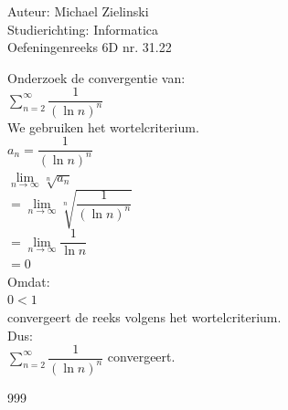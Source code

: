 \documentclass[a4paper]{article}
\begin{document}
  
\noindent \large Auteur: Michael Zielinski \\
\noindent \large Studierichting: Informatica \\
\noindent \large Oefeningenreeks 6D nr. 31.22 \\

\medskip

\normalsize

Onderzoek de convergentie van: \\

$ \displaystyle\sum_{n=2}^{\infty} \dfrac{1}{(\ln n)^n} $ \\

We gebruiken het wortelcriterium. \\

$ a_n = \dfrac{1}{(\ln n)^n} $ \\

$ \lim\limits_{n\to\infty} \sqrt[n]{a_n} $ \\

$ = \lim\limits_{n\to\infty} \sqrt[n]{\dfrac{1}{(\ln n)^n}} $ \\

$ = \lim\limits_{n\to\infty} \dfrac{1}{\ln n} $ \\

$ = 0 $ \\

Omdat: \\

$ 0 < 1 $ \\

convergeert de reeks volgens het wortelcriterium. \\

Dus: \\

$ \displaystyle\sum_{n=2}^{\infty} \dfrac{1}{(\ln n)^n} $ convergeert. \\

\begin{thebibliography}{999}
\end{thebibliography}
\end{document}
